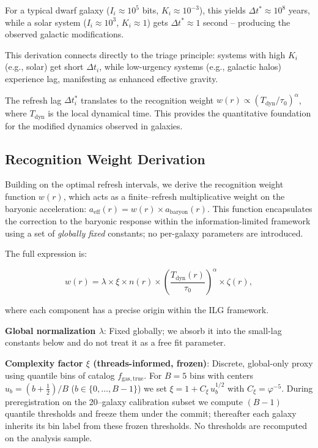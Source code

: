 \documentclass[usenatbib]{mnras}
\begin{document}
For a typical dwarf galaxy ($I_i \approx 10^5$ bits, $K_i \approx 10^{-3}$), this yields $\Delta t^* \approx 10^8$ years, while a solar system ($I_i \approx 10^3$, $K_i \approx 1$) gets $\Delta t^* \approx 1$ second – producing the observed galactic modifications.

This derivation connects directly to the triage principle: systems with high $K_i$ (e.g., solar) get short $\Delta t_i$, while low-urgency systems (e.g., galactic halos) experience lag, manifesting as enhanced effective gravity.

The refresh lag $\Delta t_i^*$ translates to the recognition weight $w(r) \propto (T_\mathrm{dyn}/\tau_0)^\alpha$, where $T_\mathrm{dyn}$ is the local dynamical time. This provides the quantitative foundation for the modified dynamics observed in galaxies.

\subsection{Recognition Weight Derivation}

Building on the optimal refresh intervals, we derive the recognition weight function $w(r)$, which acts as a finite–refresh multiplicative weight on the baryonic acceleration: $a_\mathrm{eff}(r) = w(r) \times a_\mathrm{baryon}(r)$. This function encapsulates the correction to the baryonic response within the information-limited framework using a set of \emph{globally fixed} constants; no per-galaxy parameters are introduced.

The full expression is:

\begin{equation}
w(r) = \lambda \times \xi \times n(r) \times \left(\frac{T_\mathrm{dyn}(r)}{\tau_0}\right)^\alpha \times \zeta(r),
\end{equation}

where each component has a precise origin within the ILG framework.

\textbf{Global normalization $\lambda$}: Fixed globally; we absorb it into the small-lag constants below and do not treat it as a free fit parameter.

\textbf{Complexity factor $\xi$ (threads-informed, frozen)}: Discrete, global-only proxy using quantile bins of catalog $f_\mathrm{gas,true}$. For $B=5$ bins with centers $u_b=(b+\tfrac{1}{2})/B$ ($b\in\{0,\dots,B{-}1\}$) we set $\xi = 1 + C_\xi\,u_b^{1/2}$ with $C_\xi = \varphi^{-5}$. During preregistration on the 20–galaxy calibration subset we compute $(B{-}1)$ quantile thresholds and freeze them under the commit; thereafter each galaxy inherits its bin label from these frozen thresholds. No thresholds are recomputed on the analysis sample.
\end{document}
